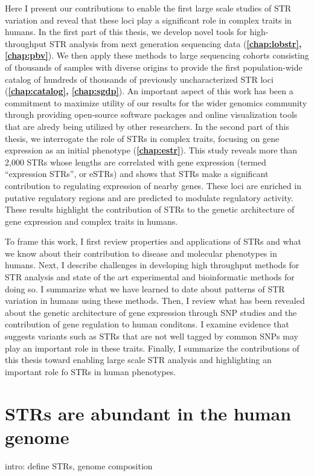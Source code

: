 Here I present our contributions to enable the first large scale studies of STR variation and reveal that these loci play a significant role in complex traits in humans. In the first part of this thesis, we develop novel tools for high-throughput STR analysis from next generation sequencing data (\textbf{\autoref{chap:lobstr}, \autoref{chap:pbv}}). We then apply these methods to large sequencing cohorts consisting of thousands of samples with diverse origins to provide the first population-wide catalog of hundreds of thousands of previously uncharacterized STR loci (\textbf{\autoref{chap:catalog}, \autoref{chap:sgdp}}). An important aspect of this work has been a commitment to maximize utility of our results for the wider genomics community through providing open-source software packages and online visualization tools that are alredy being utilized by other researchers. In the second part of this thesis, we interrogate the role of STRs in complex traits, focusing on gene expression as an initial phenotype (\textbf{\autoref{chap:estr}}). This study reveals more than 2,000 STRs whose lengths are correlated with gene expression (termed ``expression STRs'', or eSTRs) and shows that STRs make a significant contribution to regulating expression of nearby genes. These loci are enriched in putative regulatory regions and are predicted to modulate regulatory activity. These results highlight the contribution of STRs to the genetic architecture of gene expression and complex traits in humans.

To frame this work, I first review properties and applications of STRs and what we know about their contribution to disease and molecular phenotypes in humans. Next, I describe challenges in developing high throughput methods for STR analysis and state of the art experimental and bioinformatic methods for doing so. I summarize what we have learned to date about patterns of STR variation in humans using these methods. Then, I review what has been revealed about the genetic architecture of gene expression through SNP studies and the contribution of gene regulation to human conditons. I examine evidence that suggests variants such as STRs that are not well tagged by common SNPs may play an important role in these traits. Finally, I summarize the contributions of this thesis toward enabling large scale STR analysis and highlighting an important role fo STRs in human phenotypes.

\section{STRs are abundant in the human genome}
intro: define STRs, genome composition
